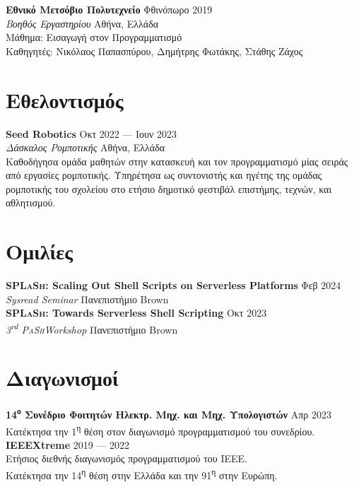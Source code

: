 \documentclass[margin, 12pt]{resume}
\newcommand{\pash}{\textsc{PaSh}}
\newcommand{\sectionVSpace}{\vspace{-3.5ex}} %
\newcommand{\splash}{\textsc{SPLaSh}\xspace}
\newcommand{\competition}[1]{\textbf{#1}\xspace}
\newcommand{\event}[1]{\textit{#1}\xspace}
\newcommand{\institution}[1]{\textbf{#1}\xspace}
\newcommand{\ordinal}[1]{\textsuperscript{#1}\xspace}
\newcommand{\rSection}[1]{\sectionVSpace\section{#1}\xspace}
\newcommand{\role}[1]{\textit{#1}\xspace}
\newcommand{\stitle}[1]{#1:\xspace}
\newcommand{\talk}[1]{\textbf{#1}\xspace}
\begin{document}
\begin{resume}
    \institution{Εθνικό Μετσόβιο Πολυτεχνείο} \hfill Φθινόπωρο 2019 \\
    \role{Βοηθός Εργαστηρίου} \hfill Αθήνα, Ελλάδα \\
    \stitle{Μάθημα} Εισαγωγή στον Προγραμματισμό \\
    \stitle{Καθηγητές} Νικόλαος Παπασπύρου, Δημήτρης Φωτάκης, Στάθης Ζάχος \\

    \rSection{Εθελοντισμός}

    \institution{Seed Robotics} \hfill Οκτ 2022 --- Ιουν 2023 \\
    \role{Δάσκαλος Ρομποτικής} \hfill Αθήνα, Ελλάδα \\
    Καθοδήγησα ομάδα μαθητών στην κατασκευή και τον προγραμματισμό μίας σειράς από εργασίες ρομποτικής. Υπηρέτησα ως συντονιστής και ηγέτης της ομάδας ρομποτικής του σχολείου στο ετήσιο δημοτικό φεστιβάλ επιστήμης, τεχνών, και αθλητισμού. \\

    \rSection{Ομιλίες}


    \talk{\splash: Scaling Out Shell Scripts on Serverless Platforms} \hfill Φεβ 2024 \\
    \event{Sysread Seminar} \hfill Πανεπιστήμιο Brown \\


    \talk{\splash: Towards Serverless Shell Scripting} \hfill Οκτ 2023 \\
    \event{3\ordinal{rd} \pash Workshop} \hfill Πανεπιστήμιο Brown \\

    \rSection{Διαγωνισμοί}

    \competition{14\ordinal{ο} Συνέδριο Φοιτητών Ηλεκτρ. Μηχ. και Μηχ. Υπολογιστών} \hfill Απρ 2023 \\
    Κατέκτησα την 1\ordinal{η} θέση στον διαγωνισμό προγραμματισμού του συνεδρίου. \\

    \competition{IEEEXtreme} \hfill 2019 --- 2022 \\
    Ετήσιος διεθνής διαγωνισμός προγραμματισμού του IEEE. \\
    Κατέκτησα την 14\ordinal{η} θέση στην Ελλάδα και την 91\ordinal{η} στην Ευρώπη. \\


\end{resume}
\end{document}
